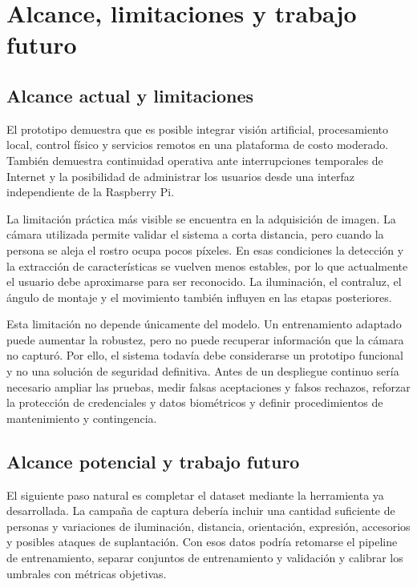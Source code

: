 \chapter{Alcance, limitaciones y trabajo futuro}

\section{Alcance actual y limitaciones}

El prototipo demuestra que es posible integrar visión artificial, procesamiento local, control físico y servicios remotos en una plataforma de costo moderado. También demuestra continuidad operativa ante interrupciones temporales de Internet y la posibilidad de administrar los usuarios desde una interfaz independiente de la Raspberry Pi.

La limitación práctica más visible se encuentra en la adquisición de imagen. La cámara utilizada permite validar el sistema a corta distancia, pero cuando la persona se aleja el rostro ocupa pocos píxeles. En esas condiciones la detección y la extracción de características se vuelven menos estables, por lo que actualmente el usuario debe aproximarse para ser reconocido. La iluminación, el contraluz, el ángulo de montaje y el movimiento también influyen en las etapas posteriores.

Esta limitación no depende únicamente del modelo. Un entrenamiento adaptado puede aumentar la robustez, pero no puede recuperar información que la cámara no capturó. Por ello, el sistema todavía debe considerarse un prototipo funcional y no una solución de seguridad definitiva. Antes de un despliegue continuo sería necesario ampliar las pruebas, medir falsas aceptaciones y falsos rechazos, reforzar la protección de credenciales y datos biométricos y definir procedimientos de mantenimiento y contingencia.

\section{Alcance potencial y trabajo futuro}

El siguiente paso natural es completar el dataset mediante la herramienta ya desarrollada. La campaña de captura debería incluir una cantidad suficiente de personas y variaciones de iluminación, distancia, orientación, expresión, accesorios y posibles ataques de suplantación. Con esos datos podría retomarse el pipeline de entrenamiento, separar conjuntos de entrenamiento y validación y calibrar los umbrales con métricas objetivas.

